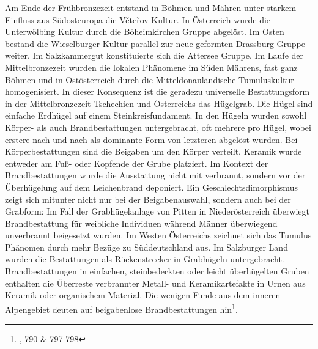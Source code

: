 \documentclass[openany,twoside,twocolumn]{book}
\let\rmarkdownfootnote\footnote%
\def\footnote{\protect\rmarkdownfootnote}
\begin{document}
Am Ende der Frühbronzezeit entstand in Böhmen und Mähren unter starkem
Einfluss aus Südosteuropa die Věteřov Kultur. In Österreich wurde die
Unterwölbing Kultur durch die Böheimkirchen Gruppe abgelöst. Im Osten
bestand die Wieselburger Kultur parallel zur neue geformten Drassburg
Gruppe weiter. Im Salzkammergut konstituierte sich die Attersee Gruppe.
Im Laufe der Mittelbronzezeit wurden die lokalen Phänomene im Süden
Mährens, fast ganz Böhmen und in Ostösterreich durch die
Mitteldonauländische Tumuluskultur homogenisiert. In dieser Konsequenz
ist die geradezu universelle Bestattungsform in der Mittelbronzezeit
Tschechien und Österreichs das Hügelgrab. Die Hügel sind einfache
Erdhügel auf einem Steinkreisfundament. In den Hügeln wurden sowohl
Körper- als auch Brandbestattungen untergebracht, oft mehrere pro Hügel,
wobei erstere nach und nach als dominante Form von letzteren abgelöst
wurden. Bei Körperbestattungen sind die Beigaben um den Körper verteilt.
Keramik wurde entweder am Fuß- oder Kopfende der Grube platziert. Im
Kontext der Brandbestattungen wurde die Ausstattung nicht mit verbrannt,
sondern vor der Überhügelung auf dem Leichenbrand deponiert. Ein
Geschlechtsdimorphismus zeigt sich mitunter nicht nur bei der
Beigabenauswahl, sondern auch bei der Grabform: Im Fall der
Grabhügelanlage von Pitten in Niederösterreich überwiegt Brandbestattung
für weibliche Individuen während Männer überwiegend unverbrannt
beigesetzt wurden. Im Westen Österreichs zeichnet sich das Tumulus
Phänomen durch mehr Bezüge zu Süddeutschland aus. Im Salzburger Land
wurden die Bestattungen als Rückenstrecker in Grabhügeln untergebracht.
Brandbestattungen in einfachen, steinbedeckten oder leicht überhügelten
Gruben enthalten die Überreste verbrannter Metall- und Keramikartefakte
in Urnen aus Keramik oder organischem Material. Die wenigen Funde aus
dem inneren Alpengebiet deuten auf beigabenlose Brandbestattungen
hin\footnote{\textcite{lubos_czech_2013}, 790 \& 797-798}.
\end{document}
